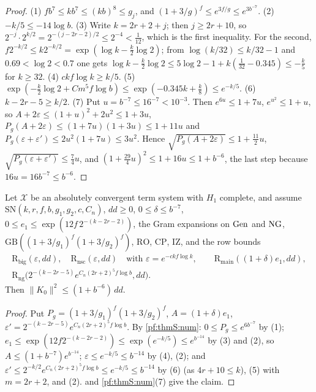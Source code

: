 \begin{proof}
(1) $fb^7\le kb^7\le(kb)^8\le g_j$, and $(1+3/g)^f\le e^{3f/g}\le e^{3b^{-7}}$. (2) $-k/5\le-14\log b$. (3) Write
$k=2r+2+j$; then $j\ge2r+10$, so $2^{-j}\cdot2^{k/2}=2^{-(j-2r-2)/2}\le2^{-4}<\frac1{12}$, which is the first
inequality. For the second, $f2^{-k/2}\le k2^{-k/2}=\exp(\log k-\frac k2\log2)$; from $\log(k/32)\le k/32-1$ and
$0.69<\log2<0.7$ one gets $\log k-\frac k2\log2\le5\log2-1+k(\frac1{32}-0.345)\le-\frac k5$ for $k\ge32$. (4)
$ckf\log k\ge k/5$. (5) $\exp(-\frac k2\log2+Cm^5f\log b)\le\exp(-0.345k+\frac k8)\le e^{-k/5}$. (6) $k-2r-5\ge k/2$.
(7) Put $u=b^{-7}\le16^{-7}<10^{-3}$. Then $e^{6u}\le1+7u$, $e^{u^2}\le1+u$, so $A+2\varepsilon\le(1+u)^2+2u^2\le1+3u$,
$P_g(A+2\varepsilon)\le(1+7u)(1+3u)\le1+11u$ and $P_g(\varepsilon+\varepsilon')\le2u^2(1+7u)\le3u^2$. Hence
$\sqrt{P_g(A+2\varepsilon)}\le1+\frac{11}2u$, $\sqrt{P_g(\varepsilon+\varepsilon')}\le\frac74u$, and
$(1+\frac{29}4u)^2\le1+16u\le1+b^{-6}$, the last step because $16u=16b^{-7}\le b^{-6}$.
\end{proof}

\begin{proposition}\label{pf:thmS:pairbound}
Let $\mathcal X$ be an absolutely convergent term system with $H_1$ complete, and assume
$\mathrm{SN}(k,r,f,b,g_1,g_2,c,C_n)$, $dd\ge0$, $0\le\delta\le b^{-7}$, $0\le e_1\le
\exp(12f\,2^{-(k-2r-2)})$, the Gram expansions on $\mathrm{Gen}$ and $\mathrm{NG}$, $\mathrm{GB}((1+3/g_1)^f(1+3/g_2)^f)$,
$\mathrm{RO}$, $\mathrm{CP}$, $\mathrm{IZ}$, and the row bounds
\begin{gather*}
\mathrm{R}_{\mathrm{big}}(\varepsilon,dd),\quad \mathrm{R}_{\mathrm{nsc}}(\varepsilon,dd)\quad\text{with }\varepsilon=e^{-ckf\log k},\qquad
\mathrm{R}_{\mathrm{main}}((1+\delta)e_1,dd),\\
\mathrm{R}_{\mathrm{ng}}\bigl(2^{-(k-2r-5)}e^{C_n(2r+2)^5f\log b},dd\bigr).
\end{gather*}
Then $\|K_0\|^2\le(1+b^{-6})\,dd$.
\end{proposition}

\begin{proof}
Put $P_g=(1+3/g_1)^f(1+3/g_2)^f$, $A=(1+\delta)e_1$, $\varepsilon'=2^{-(k-2r-5)}e^{C_n(2r+2)^5f\log b}$. By
\cref{pf:thmS:num}: $0\le P_g\le e^{6b^{-7}}$ by (1); $e_1\le\exp(12f2^{-(k-2r-2)})\le\exp(e^{-k/5})\le e^{b^{-14}}$ by (3)
and (2), so $A\le(1+b^{-7})e^{b^{-14}}$; $\varepsilon\le e^{-k/5}\le b^{-14}$ by (4), (2); and $\varepsilon'\le
2^{-k/2}e^{C_n(2r+2)^5f\log b}\le e^{-k/5}\le b^{-14}$ by (6) (as $4r+10\le k$), (5) with $m=2r+2$, and (2).
 and \cref{pf:thmS:num}(7) give the claim.
\end{proof}


